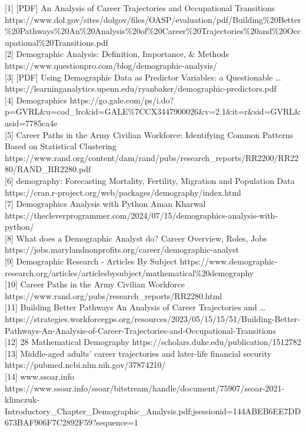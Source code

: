 \documentclass[./main.tex]{subfiles}
\begin{document}
{[}1{]} {[}PDF{]} An Analysis of Career Trajectories and Occupational
Transitions
https://www.dol.gov/sites/dolgov/files/OASP/evaluation/pdf/Building\%20Better\%20Pathways\%20An\%20Analysis\%20of\%20Career\%20Trajectories\%20and\%20Occupational\%20Transitions.pdf\\
{[}2{]} Demographic Analysis: Definition, Importance, \& Methods
https://www.questionpro.com/blog/demographic-analysis/\\
{[}3{]} {[}PDF{]} Using Demographic Data as Predictor Variables: a
Questionable \ldots{}
https://learninganalytics.upenn.edu/ryanbaker/demographic-predictors.pdf\\
{[}4{]} Demographics
https://go.gale.com/ps/i.do?p=GVRL\&u=cod\_lrc\&id=GALE\%7CCX3447900026\&v=2.1\&it=r\&sid=GVRL\&asid=7785ca4e\\
{[}5{]} Career Paths in the Army Civilian Workforce: Identifying Common
Patterns Based on Statistical Clustering
https://www.rand.org/content/dam/rand/pubs/research\_reports/RR2200/RR2280/RAND\_RR2280.pdf\\
{[}6{]} demography: Forecasting Mortality, Fertility, Migration and
Population Data
https://cran.r-project.org/web/packages/demography/index.html\\
{[}7{]} Demographics Analysis with Python \textbar{} Aman Kharwal
https://thecleverprogrammer.com/2024/07/15/demographics-analysis-with-python/\\
{[}8{]} What does a Demographic Analyst do? Career Overview, Roles, Jobs
https://jobs.marylandnonprofits.org/career/demographic-analyst\\
{[}9{]} Demographic Research - Articles By Subject
https://www.demographic-research.org/articles/articlesbysubject/mathematical\%20demography\\
{[}10{]} Career Paths in the Army Civilian Workforce
https://www.rand.org/pubs/research\_reports/RR2280.html\\
{[}11{]} Building Better Pathways An Analysis of Career Trajectories and
\ldots{}
https://strategies.workforcegps.org/resources/2023/05/15/15/51/Building-Better-Pathways-An-Analysis-of-Career-Trajectories-and-Occupational-Transitions\\
{[}12{]} 28 Mathematical Demography
https://scholars.duke.edu/publication/1512782\\
{[}13{]} Middle-aged adults' career trajectories and later-life
financial security https://pubmed.ncbi.nlm.nih.gov/37874210/\\
{[}14{]} www.ssoar.info
https://www.ssoar.info/ssoar/bitstream/handle/document/75907/ssoar-2021-klimczuk-Introductory\_Chapter\_Demographic\_Analysis.pdf;jsessionid=144ABEB6EE7DD673BAF906F7C2892F59?sequence=1\\
\end{document}
